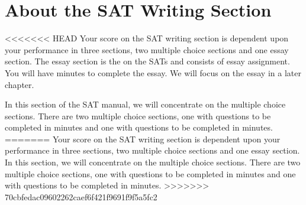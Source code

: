 \section{About the SAT Writing Section}

<<<<<<< HEAD
Your score on the SAT writing section is dependent upon your performance in three sections, two multiple choice sections and one essay section. The essay section is the \hrulefill on the SATs and consists of \hrulefill essay assignment. You will have \hrulefill minutes to complete the essay. We will focus on the essay in a later chapter. 

In this section of the SAT manual, we will concentrate on the multiple choice sections. There are two multiple choice sections, one with \hrulefill questions to be completed in \hrulefill minutes and one with \hrulefill questions to be completed in \hrulefill minutes.
=======
Your score on the SAT writing section is dependent upon your performance in three sections, two multiple choice sections and one essay section. In this section, we will concentrate on the multiple choice sections. There are two multiple choice sections, one with \underline{\hspace{2in}} questions to be completed in \underline{\hspace{2in}} minutes and one with \underline{\hspace{2in}} questions to be completed in \underline{\hspace{2in}} minutes.
>>>>>>> 70cbfedac09602262caef6f421f9691f9f5a5fc2
